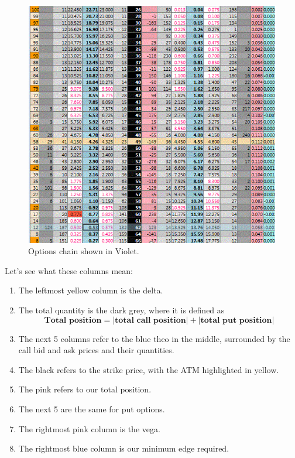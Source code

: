 \documentclass{article}
\begin{document}
    \begin{figure}[H]
      \centering 
       \includegraphics[scale=0.4]{img/violet.png}
      \caption{Options chain shown in Violet. } 
      \label{fig:violet}
    \end{figure}

    Let's see what these columns mean: 
    \begin{enumerate}
      \item The leftmost yellow column is the delta. 
      \item The total quantity is the dark grey, where it is defined as 
        \begin{equation}
          \textbf{Total position} = |\textbf{total call position}| + |\textbf{total put position}|
        \end{equation}
      \item The next 5 columns refer to the blue theo in the middle, surrounded by the call bid and ask prices and their quantities. 
      \item The black refers to the strike price, with the ATM highlighted in yellow. 
      \item The pink refers to our total position. 
      \item The next 5 are the same for put options. 
      \item The rightmost pink column is the vega. 
      \item The rightmost blue column is our minimum edge required. 
    \end{enumerate}
\end{document}
